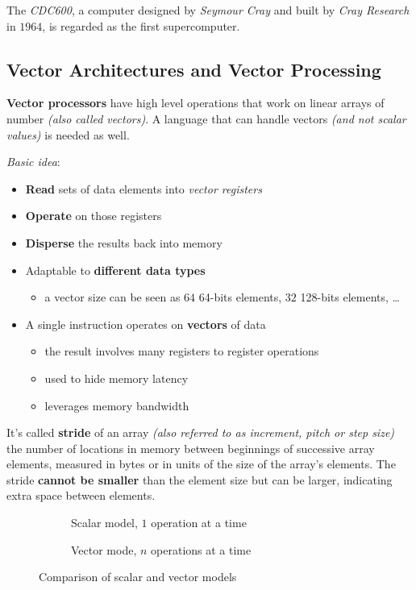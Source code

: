 \documentclass[english]{article}
\begin{document}
The \textit{CDC600}, a computer designed by \textit{Seymour Cray} and built by \textit{Cray Research} in \(1964\), is regarded as the first supercomputer.

\subsection{Vector Architectures and Vector Processing}

\textbf{Vector processors} have high level operations that work on linear arrays of number \textit{(also called vectors)}.
A language that can handle vectors \textit{(and not scalar values)} is needed as well.

\bigskip
\textit{Basic idea}:
\begin{itemize}
  \item \textbf{Read} sets of data elements into \textit{vector registers}
  \item \textbf{Operate} on those registers
  \item \textbf{Disperse} the results back into memory
  \item Adaptable to \textbf{different data types}
        \begin{itemize}
          \item a vector size can be seen as \(64\) 64-bits elements, \(32\) 128-bits elements, \ldots
        \end{itemize}
  \item A single instruction operates on \textbf{vectors} of data
        \begin{itemize}
          \item the result involves many registers to register operations
          \item used to hide memory latency
          \item leverages memory bandwidth
        \end{itemize}
\end{itemize}

\bigskip
It's called \textbf{stride} of an array \textit{(also referred to as increment, pitch or step size)} the number of locations in memory between beginnings of successive array elements, measured in bytes or in units of the size of the array's elements. The stride \textbf{cannot be smaller} than the element size but can be larger, indicating extra space between elements.

\begin{figure}[htbp]
  \bigskip
  \centering
  \begin{subfigure}[b]{0.495\textwidth}
    \centering
    \caption{Scalar model, \(1\) operation at a time}
    \label{subfig:vector-model}
  \end{subfigure}
  \begin{subfigure}[b]{0.495\textwidth}
    \centering
    \caption{Vector mode, \(n\) operations at a time}
    \label{subfig:scalar-model}
  \end{subfigure}
  \caption{Comparison of scalar and vector models}
  \label{fig:comparison-of-models}
  \bigskip
\end{figure}
\end{document}
